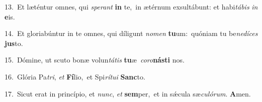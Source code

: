 {\numbfont\textcolor{\numbcolor}{13.}}~Et læténtur omnes, qui \textit{spe}\-\textit{rant} \textbf{in} te,~\star in ætérnum exsultábunt: et habi\-\textit{tá}\-\textit{bis} \textit{in} \textbf{e}\-is.\par
{\numbfont\textcolor{\numbcolor}{14.}}~Et gloriabúntur in te omnes, qui díligunt \textit{no}\-\textit{men} \textbf{tu}\-um:~\star quóniam tu be\-\textit{ne}\-\textit{dí}\textit{ces} \textbf{jus}\-to.\par
{\numbfont\textcolor{\numbcolor}{15.}}~Dómine, ut scuto bonæ volun\-\textit{tá}\-\textit{tis} \textbf{tu}\-æ~\star \textit{co}\-\textit{ro}\textbf{nás}\textbf{ti} nos.\par
{\numbfont\textcolor{\numbcolor}{16.}}~Glória Pa\-\textit{tri}\-, \textit{et} \textbf{Fí}\-lio,~\star et Spi\-\textit{rí}\-\textit{tu}\textit{i} \textbf{Sanc}\-to.\par
{\numbfont\textcolor{\numbcolor}{17.}}~Sicut erat in princípio, et \textit{nunc}\-, \textit{et} \textbf{sem}\-per,~\star et in sǽcula sæ\-\textit{cu}\-\textit{ló}\textit{rum}. \textbf{A}\-men.\par
